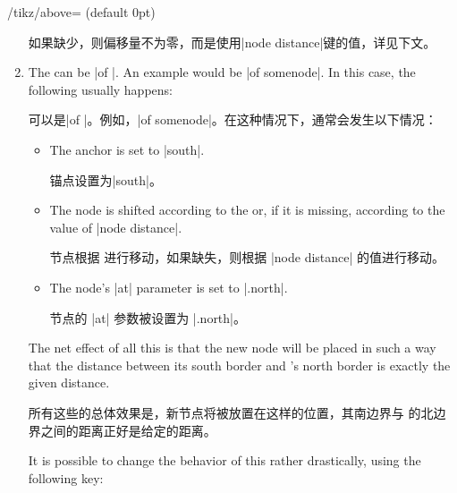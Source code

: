 \begin{key}{/tikz/above= (default 0pt)}
\begin{enumerate}
            如果缺少，则偏移量不为零，而是使用|node distance|键的值，详见下文。
        \item The  can be |of |. An example would
            be |of somenode|. In this case, the following usually happens:
            
            可以是|of |。例如，|of somenode|。在这种情况下，通常会发生以下情况：
            \begin{itemize}
                \item The anchor is set to |south|.

                锚点设置为|south|。
                \item The node is shifted according to the 
                    or, if it is missing, according to the value of
                    |node distance|.

                    节点根据  进行移动，如果缺失，则根据 |node distance| 的值进行移动。
                \item The node's |at| parameter is set to |.north|.

                    节点的 |at| 参数被设置为 |.north|。
            \end{itemize}
            The net effect of all this is that the new node will be placed in
            such a way that the distance between its south border and 's north border is exactly the given distance.
            
            所有这些的总体效果是，新节点将被放置在这样的位置，其南边界与  的北边界之间的距离正好是给定的距离。
\begin{codeexample}[preamble={\usetikzlibrary{positioning}}]
\end{codeexample}
            It is possible to change the behavior of this 
            rather drastically, using the following key:
            

\end{enumerate}
\end{key}

